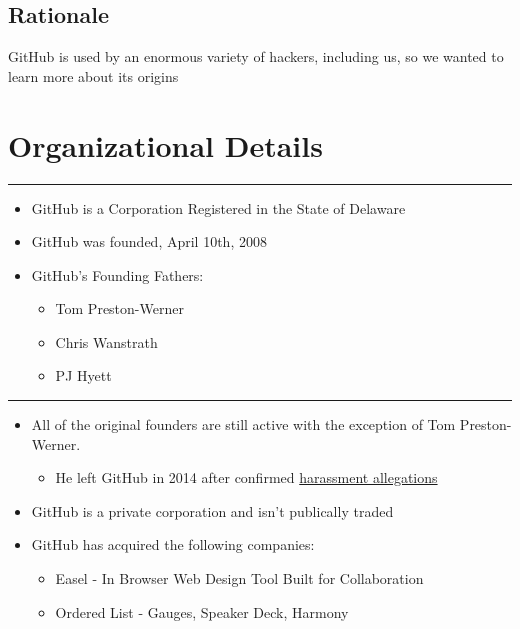 \subsection{Rationale}\label{rationale}

GitHub is used by an enormous variety of hackers, including us, so we
wanted to learn more about its origins

\section{Organizational Details}\label{organizational-details}

\begin{center}\rule{3in}{0.4pt}\end{center}

\begin{itemize}
\itemsep1pt\parskip0pt
\item
  GitHub is a Corporation Registered in the State of Delaware
\item
  GitHub was founded, April 10th, 2008
\item
  GitHub's Founding Fathers:

  \begin{itemize}
  \itemsep1pt\parskip0pt
  \item
    Tom Preston-Werner
  \item
    Chris Wanstrath
  \item
    PJ Hyett
  \end{itemize}
\end{itemize}

\begin{center}\rule{3in}{0.4pt}\end{center}

\begin{itemize}
\itemsep1pt\parskip0pt
\item
  All of the original founders are still active with the exception of
  Tom Preston-Werner.

  \begin{itemize}
  \itemsep1pt\parskip0pt
  \item
    He left GitHub in 2014 after confirmed
    \href{http://bits.blogs.nytimes.com/2014/04/21/github-founder-resigns-after-investigation/}{harassment
    allegations}
  \end{itemize}
\item
  GitHub is a private corporation and isn't publically traded
\item
  GitHub has acquired the following companies:

  \begin{itemize}
  \itemsep1pt\parskip0pt
  \item
    Easel - In Browser Web Design Tool Built for Collaboration
  \item
    Ordered List - Gauges, Speaker Deck, Harmony
  \end{itemize}
\end{itemize}

